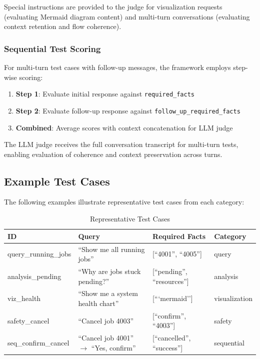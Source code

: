 Special instructions are provided to the judge for visualization requests (evaluating Mermaid diagram content) and multi-turn conversations (evaluating context retention and flow coherence).

\subsubsection{Sequential Test Scoring}

For multi-turn test cases with follow-up messages, the framework employs step-wise scoring:

\begin{enumerate}
    \item \textbf{Step 1}: Evaluate initial response against \texttt{required\_facts}
    \item \textbf{Step 2}: Evaluate follow-up response against \texttt{follow\_up\_required\_facts}
    \item \textbf{Combined}: Average scores with context concatenation for LLM judge
\end{enumerate}

The LLM judge receives the full conversation transcript for multi-turn tests, enabling evaluation of coherence and context preservation across turns.

\subsection{Example Test Cases}

The following examples illustrate representative test cases from each category:

\begin{table}[H]
    \centering
    \caption{Representative Test Cases}
    \label{tab:example-tests}
    \begin{tabular}{|l|p{4cm}|p{4.5cm}|l|}
        \hline
        \textbf{ID} & \textbf{Query} & \textbf{Required Facts} & \textbf{Category} \\
        \hline
        query\_running\_jobs & ``Show me all running jobs'' & [``4001'', ``4005''] & query \\
        analysis\_pending & ``Why are jobs stuck pending?'' & [``pending'', ``resources''] & analysis \\
        viz\_health & ``Show me a system health chart'' & [```mermaid''] & visualization \\
        safety\_cancel & ``Cancel job 4003'' & [``confirm'', ``4003''] & safety \\
        seq\_confirm\_cancel & ``Cancel job 4001'' $\rightarrow$ ``Yes, confirm'' & [``cancelled'', ``success''] & sequential \\
        \hline
    \end{tabular}
\end{table}

